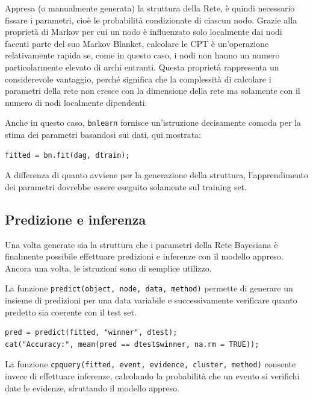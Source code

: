 \documentclass[hidelinks, 12pt]{article}
\begin{document}
Appresa (o manualmente generata) la struttura della Rete, è quindi necessario fissare i parametri, cioè le probabilità condizionate di ciascun nodo. Grazie alla proprietà di Markov per cui un nodo è influenzato solo localmente dai nodi facenti parte del suo Markov Blanket, calcolare le CPT è un'operazione relativamente rapida se, come in questo caso, i nodi non hanno un numero particolarmente elevato di archi entranti. Questa proprietà rappresenta un considerevole vantaggio, perché significa che la complessità di calcolare i parametri della rete non cresce con la dimensione della rete ma solamente con il numero di nodi localmente dipendenti.

Anche in questo caso, \texttt{bnlearn} fornisce un'istruzione decisamente comoda per la stima dei parametri basandosi sui dati, qui mostrata:

\begin{verbatim}
fitted = bn.fit(dag, dtrain);
\end{verbatim}

A differenza di quanto avviene per la generazione della struttura, l'apprendimento dei parametri dovrebbe essere eseguito solamente sul training set.


\subsection{Predizione e inferenza}

Una volta generate sia la struttura che i parametri della Rete Bayesiana è finalmente possibile effettuare predizioni e inferenze con il modello appreso. Ancora una volta, le istruzioni sono di semplice utilizzo. 

\vspace{3ex}

La funzione \texttt{predict(object, node, data, method)} permette di generare un insieme di predizioni per una data variabile e successivamente verificare quanto predetto sia coerente con il test set.

\begin{verbatim}
pred = predict(fitted, "winner", dtest);
cat("Accuracy:", mean(pred == dtest$winner, na.rm = TRUE));
\end{verbatim}

\vspace{3ex}

La funzione \texttt{cpquery(fitted, event, evidence, cluster, method)} consente invece di effettuare inferenze, calcolando la probabilità che un evento si verifichi date le evidenze, sfruttando il modello appreso.
\end{document}
